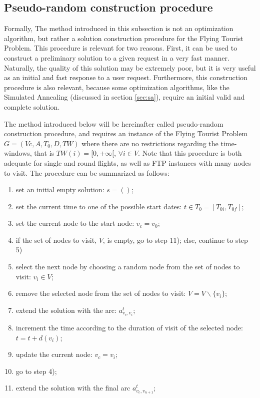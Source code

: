 \subsection{Pseudo-random construction procedure}
\label{sec:pseudo_random}

Formally, The method introduced in this subsection is not an optimization algorithm, but rather a solution construction procedure for the Flying Tourist Problem. This procedure is relevant for two reasons. First, it can be used to construct a preliminary solution to a given request in a very fast manner. Naturally, the quality of this solution may be extremely poor, but it is very useful as an initial and fast response to a user request. 
Furthermore, this construction procedure is also relevant, because some optimization algorithms, like the Simulated Annealing (discussed in section \ref{sec:sa}), require an initial valid and complete solution.

The method introduced below will be hereinafter called pseudo-random construction procedure, and requires an instance of the Flying Tourist Problem $G=(Vc,A,T_0,D,TW)$ where there are no restrictions regarding the time-windows, that is $TW(i) = [0, +\infty[$, $\forall i \in V$. Note that this procedure is both adequate for single and round flights, as well as FTP instances with many nodes to visit. The procedure can be summarized as follows:

\begin{enumerate}
\itemsep0em 
    \item set an initial empty solution: $s=()$;
    \item set the current time to one of the possible start dates: $t \in T_0=[T_{0i}, T_{0f}]$;
    \item set the current node to the start node: $v_c = v_0$;
    \item if the set of nodes to visit, $V$, is empty, go to step 11); else, continue to step 5)
    \item select the next node by choosing a random node from the set of nodes to visit: $v_i \in V$;
    \item remove the selected node from the set of nodes to visit: $V=V\backslash\{v_i\}$;
    \item extend the solution with the arc: $a_{v_c, v_i}^t$;
    \item increment the time according to the duration of visit of the selected node: $t=t+d(v_i)$;
    \item update the current node: $v_c=v_i$;
    \item go to step 4);
    \item extend the solution with the final arc $a_{v_c, v_{n+1}}^t$;
\end{enumerate}

